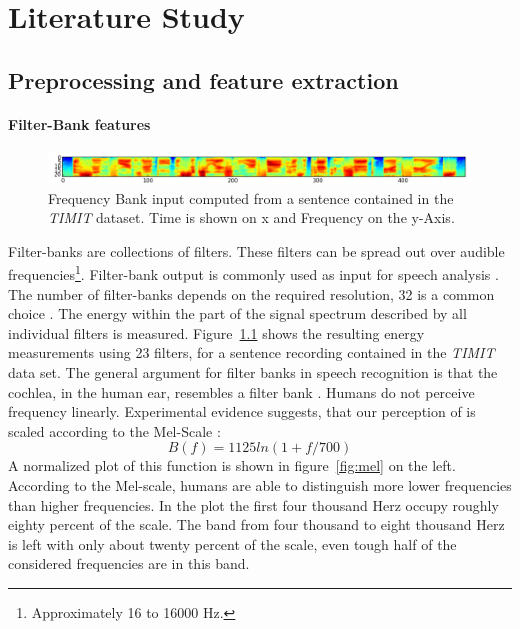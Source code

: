 \chapter{Literature Study}
\label{cha:intro}

\section{Preprocessing and feature extraction}
\subsubsection{Filter-Bank features}
\begin{figure}
\centering
\includegraphics[width=1.0\linewidth]{../png/timitInput}
\caption{Frequency Bank input computed from a sentence contained in the \textit{TIMIT} dataset. Time is shown on x and Frequency on the y-Axis.}
\label{fig:timitInput}
\end{figure}
Filter-banks are collections of filters. These filters can be spread out over audible frequencies\footnote{Approximately 16 to 16000 Hz.}. Filter-bank output is commonly used as input for speech analysis \cite{Huang2001}\cite{Chan2015}. The number of filter-banks depends on the required resolution, 32 is a common choice \cite{Juang1987}. The energy within the part of the signal spectrum described by all individual filters is measured. Figure~\ref{fig:timitInput} shows the resulting energy measurements using 23 filters, for a sentence recording contained in the \textit{TIMIT} data set. 
The general argument for filter banks in speech recognition is that the cochlea, in the human ear, resembles a filter bank \cite[page 30]{Huang2001}. Humans do not perceive frequency linearly. Experimental evidence suggests, that our perception of is scaled according to the Mel-Scale \cite[page 34]{Huang2001}:
\begin{equation}
B(f) = 1125 ln(1 + f / 700)
\end{equation}
A normalized plot of this function is shown in figure~\ref{fig:mel} on the left.
According to the Mel-scale, humans are able to distinguish more lower frequencies than higher frequencies. In the plot the first four thousand Herz occupy roughly eighty percent of the scale. The band from four thousand to eight thousand Herz is left with only about twenty percent of the scale, even tough half of the considered frequencies are in this band. 
